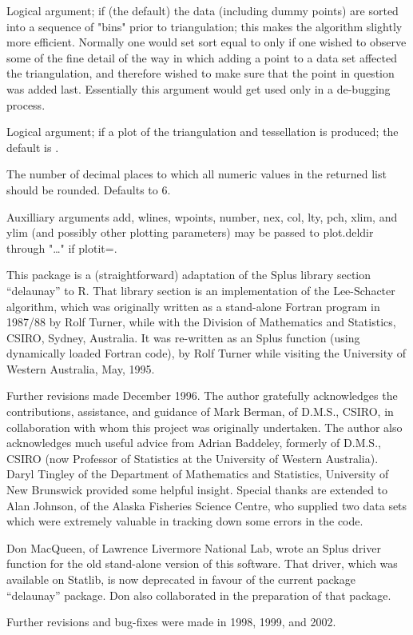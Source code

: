 \begin{Arguments}
\begin{ldescription}
\item[\code{sort}] Logical argument; if  (the default) the data (including dummy
points) are sorted into a sequence of "bins" prior to triangulation;
this makes the algorithm slightly more efficient.  Normally one would
set sort equal to  only if one wished to observe some of the
fine detail of the way in which adding a point to a data set affected
the triangulation, and therefore wished to make sure that the point
in question was added last.  Essentially this argument would get used
only in a de-bugging process.

\item[\code{plotit}] Logical argument; if  a plot of the triangulation and tessellation
is produced; the default is .

\item[\code{digits}] The number of decimal places to which all numeric values in the
returned list should be rounded.  Defaults to 6.

\item[\code{...}] Auxilliary arguments add, wlines, wpoints, number, nex, col, lty,
pch, xlim, and ylim (and possibly other plotting parameters) may be
passed to plot.deldir through "\dots" if plotit=.

\end{ldescription}
\end{Arguments}
\begin{Details}\relax
This package is a (straightforward) adaptation of the Splus library
section ``delaunay'' to R.  That library section is an implementation
of the Lee-Schacter algorithm, which was originally written as a
stand-alone Fortran program in 1987/88 by Rolf Turner, while with the
Division of Mathematics and Statistics, CSIRO, Sydney, Australia.  It
was re-written as an Splus function (using dynamically loaded Fortran
code), by Rolf Turner while visiting the University of Western
Australia, May, 1995.

Further revisions made December 1996. The author gratefully
acknowledges the contributions, assistance, and guidance of Mark
Berman, of D.M.S., CSIRO, in collaboration with whom this project was
originally undertaken.  The author also acknowledges much useful
advice from Adrian Baddeley, formerly of D.M.S., CSIRO (now Professor
of Statistics at the University of Western Australia).  Daryl Tingley
of the Department of Mathematics and Statistics, University of New
Brunswick provided some helpful insight.  Special thanks are extended
to Alan Johnson, of the Alaska Fisheries Science Centre, who supplied
two data sets which were extremely valuable in tracking down some
errors in the code.

Don MacQueen, of Lawrence Livermore National Lab, wrote an Splus
driver function for the old stand-alone version of this software.
That driver, which was available on Statlib, is now deprecated in
favour of the current package ``delaunay'' package.  Don also
collaborated in the preparation of that package.

Further revisions and bug-fixes were made in 1998, 1999, and 2002.
\end{Details}
